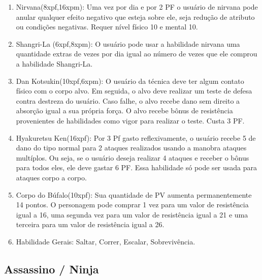 \begin{enumerate}
	\item Nirvana(8xpf,16xpm): Uma vez por dia e por 2 PF o usuário de nirvana pode anular qualquer efeito negativo que esteja sobre ele, seja redução de atributo ou condições negativas. Requer nível físico 10 e mental 10.
	  
  \item Shangri-La (6xpf,8xpm): O usuário pode usar a habilidade nirvana uma quantidade extras de vezes por dia igual ao número de vezes que ele comprou a habilidade Shangri-La.
	
	\item Dan Kotsukin(10xpf,6xpm): O usuário da técnica deve ter algum contato físico com o corpo alvo. Em seguida, o alvo deve realizar um teste de defesa contra destreza do usuário. Caso falhe, o alvo recebe dano sem direito a absorção igual a sua própria força. O alvo recebe bônus de resistência provenientes de habilidades como vigor para realizar o teste. Custa 3 PF. 
	
	\item Hyakuretsu Ken(16xpf): Por 3 Pf gasto reflexivamente, o usuário recebe 5 de dano do tipo normal para 2 ataques realizados usando a manobra ataques multíplos. Ou seja, se o usuário deseja realizar 4 ataques e receber o bônus para todos eles, ele deve gastar 6 PF. Essa habilidade só pode ser usada para ataques corpo a corpo.
 	
    \item Corpo do Búfalo(10xpf): Sua quantidade de PV aumenta permanentemente 14 pontos. O personagem pode comprar 1 vez para um valor de resistência igual a 16, uma segunda vez para um valor de resistência igual a 21 e uma terceira para um valor de resistência igual a 26.

  
  	\item Habilidade Gerais: Saltar, Correr, Escalar, Sobrevivência.
\end{enumerate}

\subsection{Assassino / Ninja} 


